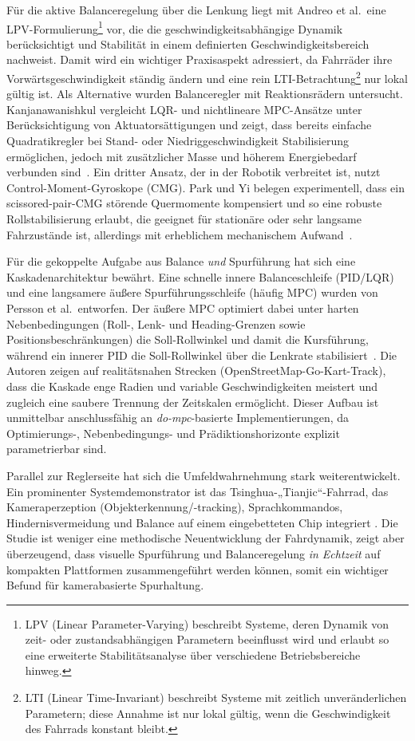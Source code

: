 Für die aktive Balanceregelung über die Lenkung liegt mit Andreo et al.\ eine
LPV-Formulierung\footnote{LPV (Linear Parameter-Varying) beschreibt Systeme, deren Dynamik von zeit- oder zustandsabhängigen Parametern 
beeinflusst wird und erlaubt so eine erweiterte Stabilitätsanalyse über verschiedene Betriebsbereiche hinweg.} vor, 
die die geschwindigkeitsabhängige Dynamik berücksichtigt und Stabilität in einem definierten 
Geschwindigkeitsbereich nachweist\citep{andreo2009}. Damit wird ein wichtiger Praxisaspekt adressiert, 
da Fahrräder ihre Vorwärtsgeschwindigkeit ständig ändern und eine rein 
LTI-Betrachtung\footnote{LTI (Linear Time-Invariant) beschreibt Systeme mit zeitlich unveränderlichen Parametern; 
diese Annahme ist nur lokal gültig, wenn die Geschwindigkeit des Fahrrads konstant bleibt.} nur lokal gültig ist. 
Als Alternative wurden Balanceregler mit Reaktionsrädern untersucht. Kanjanawanishkul vergleicht 
LQR- und nichtlineare MPC-Ansätze unter Berücksichtigung von Aktuatorsättigungen und zeigt, 
dass bereits einfache Quadratikregler bei Stand- oder Niedriggeschwindigkeit Stabilisierung ermöglichen, 
jedoch mit zusätzlicher Masse und höherem Energiebedarf verbunden sind~\citep{kanjanawanishkul2015}. 
Ein dritter Ansatz, der in der Robotik verbreitet ist, nutzt Control-Moment-Gyroskope (CMG).
Park und Yi belegen experimentell, dass ein scissored-pair-CMG störende Quermomente kompensiert 
und so eine robuste Rollstabilisierung erlaubt, die geeignet für stationäre oder sehr langsame Fahrzustände ist, 
allerdings mit erheblichem mechanischem Aufwand~\citep{park2020}.

Für die gekoppelte Aufgabe aus Balance \emph{und} Spurführung hat sich eine Kaskaden­architektur bewährt. Eine schnelle innere Balanceschleife 
(PID/LQR) und eine langsamere äußere Spurführungsschleife (häufig MPC) wurden von Persson et al.\ entworfen. 
Der äußere MPC optimiert dabei unter harten Nebenbedingungen (Roll-, Lenk- und Heading-Grenzen 
sowie Positionsbeschränkungen) die Soll-Rollwinkel und damit die Kursführung, 
während ein innerer PID die Soll-Rollwinkel über die Lenkrate stabilisiert~\citep{persson2021}. Die Autoren zeigen auf realitätsnahen Strecken (OpenStreetMap-Go-Kart-Track), dass die Kaskade 
enge Radien und variable Geschwindigkeiten meistert und zugleich eine saubere Trennung der Zeitskalen ermöglicht. Dieser Aufbau ist unmittelbar anschlussfähig an 
\emph{do-mpc}-basierte Implementierungen, da Optimierungs-, Nebenbedingungs- und Prädiktionshorizonte explizit parametrierbar sind.

Parallel zur Reglerseite hat sich die Umfeldwahrnehmung stark weiterentwickelt. Ein prominenter Systemdemonstrator ist das Tsinghua-„Tianjic“-Fahrrad, 
das Kameraperzeption (Objekterkennung/-tracking), Sprachkommandos, Hindernisvermeidung und Balance auf einem eingebetteten Chip integriert 
\citep{pei2019tianjic}. Die Studie ist weniger eine methodische Neuentwicklung der Fahrdynamik, zeigt aber überzeugend, dass visuelle Spurführung 
und Balanceregelung \emph{in Echtzeit} auf kompakten Plattformen zusammengeführt werden können, somit ein wichtiger Befund für kamerabasierte Spurhaltung.


